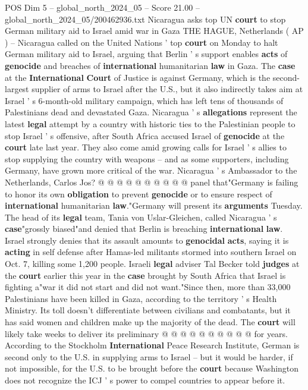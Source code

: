 \begin{textsample}{POS Dim 5 – global\_north\_2024\_05 – Score 21.00 – global\_north\_2024\_05/200462936.txt}  \label{ex:f5_pos_171}
Nicaragua asks top UN \textbf{court} to stop German military aid to Israel amid war in Gaza THE HAGUE, Netherlands ( AP ) -- Nicaragua called on the United Nations ' top \textbf{court} on Monday to halt German military aid to Israel, arguing that Berlin ' s support enables \textbf{acts} of \textbf{genocide} and breaches of \textbf{international} humanitarian \textbf{law} in Gaza.
The \textbf{case} at the \textbf{International} \textbf{Court} of Justice is against Germany, which is the second-largest supplier of arms to Israel after the U.S., but it also indirectly takes aim at Israel ' s 6-month-old military campaign, which has left tens of thousands of Palestinians dead and devastated Gaza.
Nicaragua ' s \textbf{allegations} represent the latest \textbf{legal} attempt by a country with historic ties to the Palestinian people to stop Israel ' s offensive, after South Africa accused Israel of \textbf{genocide} at the \textbf{court} late last year.
They also come amid growing calls for Israel ' s allies to stop supplying the country with weapons -- and as some supporters, including Germany, have grown more critical of the war.
Nicaragua ' s Ambassador to the Netherlands, Carlos Jos? @ @ @ @ @ @ @ @ @ @ panel that"Germany is failing to honor its own \textbf{obligation} to prevent \textbf{genocide} or to ensure respect of \textbf{international} humanitarian \textbf{law}."Germany will present its \textbf{arguments} Tuesday.
The head of its \textbf{legal} team, Tania von Uslar-Gleichen, called Nicaragua ' s \textbf{case}"grossly biased"and denied that Berlin is breaching \textbf{international} \textbf{law}.
Israel strongly denies that its assault amounts to \textbf{genocidal} \textbf{acts}, saying it is \textbf{acting} in self defense after Hamas-led militants stormed into southern Israel on Oct. 7, killing some 1,200 people.
Israeli \textbf{legal} adviser Tal Becker told \textbf{judges} at the \textbf{court} earlier this year in the \textbf{case} brought by South Africa that Israel is fighting a"war it did not start and did not want."Since then, more than 33,000 Palestinians have been killed in Gaza, according to the territory ' s Health Ministry.
Its toll doesn't differentiate between civilians and combatants, but it has said women and children make up the majority of the dead.
The \textbf{court} will likely take weeks to deliver its preliminary @ @ @ @ @ @ @ @ @ @ for years.
According to the Stockholm \textbf{International} Peace Research Institute, German is second only to the U.S. in supplying arms to Israel -- but it would be harder, if not impossible, for the U.S. to be brought before the \textbf{court} because Washington does not recognize the ICJ ' s power to compel countries to appear before it.

\end{textsample}

